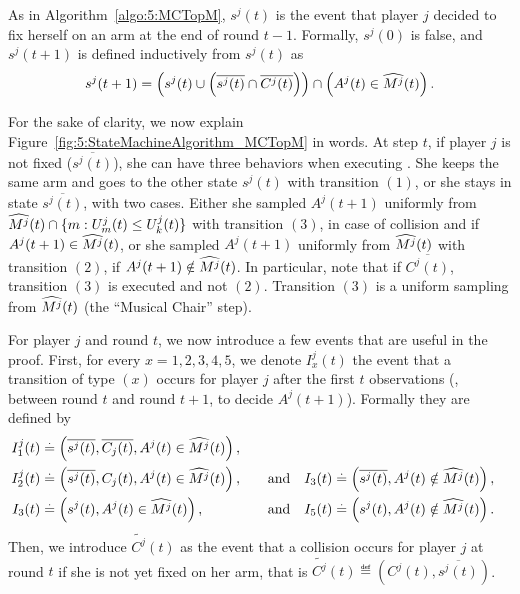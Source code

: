 \begin{smallproof}

  As in Algorithm~\ref{algo:5:MCTopM}, $s^j(t)$ is the event that player $j$ decided to fix herself on an arm at the end of round $t-1$.
  Formally, $s^j(0)$ is false, and $s^j(t+1)$ is defined inductively from $s^j(t)$ as
  \begin{equation}
      s^j(t+1) =
      \left( s^j(t) \cup \left( \overline{s^j(t)} \cap \overline{C^j(t)} \right) \right)
      \cap \left( A^j(t) \in \widehat{M^j}(t) \right).
  \end{equation}

  For the sake of clarity, we now explain Figure~\ref{fig:5:StateMachineAlgorithm_MCTopM} in words. At step $t$, if player $j$ is not fixed ($\overline{s^j(t)}$), she can have three behaviors when executing \MCTopM.
  She keeps the same arm and goes to the other state $s^j(t)$ with transition $(1)$,
  or she stays in state $\overline{s^j(t)}$,
  with two cases.
  Either she sampled $A^j(t+1)$ uniformly
  from $\widehat{M^j}(t) \cap \{ m : U_m^j(t) \leq U_k^j(t) \}$
  with transition $(3)$,
  in case of collision and if $A^j(t+1) \in \widehat{M^j}(t)$,
  or she sampled $A^j(t+1)$ uniformly
  from $\widehat{M^j}(t)$ with transition $(2)$,
  if $A^j(t+1) \notin \widehat{M^j}(t)$.
  In particular, note that if $\overline{C^j(t)}$, transition $(3)$ is executed and not $(2)$.
  Transition $(3)$ is a uniform sampling from $\widehat{M^j}(t)$ (the ``Musical Chair'' step).


  For player $j$ and round $t$, we now introduce a few events that are useful in the proof. First, for every $x=1,2,3,4,5$, we denote $I_x^j(t)$ the event that a transition of type $(x)$ occurs for player $j$ after the first $t$ observations (\ie, between round $t$ and round $t+1$, to decide $A^j(t+1)$).
  Formally they are defined by
  \begin{align*}
    I_1^j(t) & \overset{.}{=} \left(\overline{s^j(t)},\overline{C_j(t)}, A^j(t) \in \widehat{M^j}(t)\right), \\
    I_2^j(t) & \overset{.}{=} \left(\overline{s^j(t)},C_j(t), A^j(t) \in \widehat{M^j}(t)\right),
    \ \ \ &\text{and} \ \ \
    I_3(t) & \overset{.}{=} \left(\overline{s^j(t)},A^j(t) \notin \widehat{M^j}(t)\right), \\
    I_3(t) & \overset{.}{=} \left(s^j(t),A^j(t) \in \widehat{M^j}(t)\right),
    \ \ \ &\text{and} \ \ \
    I_5(t) & \overset{.}{=} \left(s^j(t),A^j(t) \notin \widehat{M^j}(t)\right).
  \end{align*}
  Then, we introduce $\widetilde{C^j}(t)$ as the event that a collision occurs for player $j$ at round $t$ if she is not yet fixed on her arm, that is
  $\widetilde{C^j}(t) \eqdef \left(C^j(t), \overline{s^j(t)}\right)$.


\end{smallproof}
